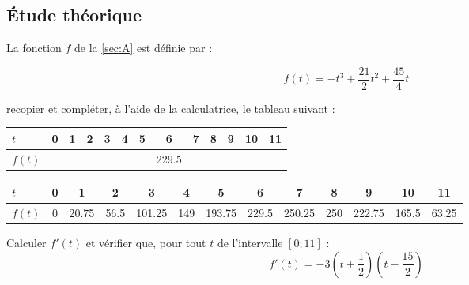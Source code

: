 \subsection{\'Etude théorique}

La fonction $f$ de la \ref{sec:A} est définie par :

	\begin{equation*}
		f(t) = -t^3 + \frac{21}{2} t^2 + \frac{45}{4}t
	\end{equation*}
	
\begin{questions}
	\question[2] recopier et compléter, à l'aide de la calculatrice, le tableau suivant :
	\begin{center}
		
	\begin{tabular}{|@{\ }l@{\ }|@{\ \ }c@{\ \ }|@{\ \ }c@{\ \ }|@{\ \ }c@{\ \ }|@{\ \ }c@{\ \ }|@{\ \ }c@{\ \ }|@{\ \ }c@{\ \ }|@{\ \ }c@{\ \ }|@{\ \ }c@{\ \ }|@{\ \ }c@{\ \ }|@{\ \ }c@{\ \ }|@{\ \ }c@{\ \ }|@{\ \ }c@{\ \ }|}
		\hline
		$t$    & 0 & 1 & 2 & 3 & 4 & 5 & 6           & 7 & 8 & 9 & 10 & 11 \\ \hline
		$f(t)$ &   &   &   &   &   &   & \num{229.5} &   &   &   &    &    \\ \hline
	\end{tabular}
	\end{center}

	\begin{solution}
		\begin{center}
			
			\begin{tabular}{|@{\ }l@{\ }|@{\ }c@{\ }|@{\ }c@{\ }|@{\ }c@{\ }|@{\ }c@{\ }|@{\ }c@{\ }|@{\ }c@{\ }|@{\ }c@{\ }|@{\ }c@{\ }|@{\ }c@{\ }|@{\ }c@{\ }|@{\ }c@{\ }|@{\ }c@{\ }|}
				\hline
				$t$    & 0 & 1 & 2 & 3 & 4 & 5 & 6           & 7 & 8 & 9 & 10 & 11 \\ \hline
				$f(t)$ & 0  & \num{20.75}  & \num{56.5}  & \num{101.25}  & \num{149}  & \num{193.75}  & \num{229.5} & \num{250.25}  & \num{250}  & \num{222.75}  &  \num{165.5}  &  \num{63.25}  \\ \hline
			\end{tabular}
		\end{center}
	\end{solution}

	\question[2] Calculer $f'(t)$ et vérifier que, pour tout $t$ de l'intervalle $\left[0; 11\right]$ :
		\begin{equation*}
			f'(t) = -3 \left(t + \frac{1}{2} \right) \left(t - \frac{15}{2} \right)
		\end{equation*}
		

\end{questions}
